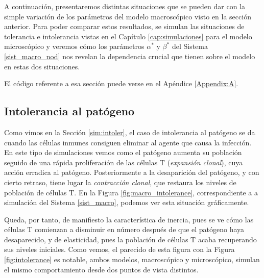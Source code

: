 A continuación, presentaremos distintas situaciones que se pueden dar con la simple variación de los parámetros del modelo macroscópico visto en la sección anterior. Para poder comparar estos resultados, se simulan las situaciones de tolerancia e intolerancia vistas en el Capítulo \ref{cap:simulaciones} para el modelo microscópico y veremos cómo los parámetros $\alpha^{*}$ y $\beta^{*}$ del Sistema \ref{sist_macro_nod} nos revelan la dependencia crucial que tienen sobre el modelo en estas dos situaciones.

El código referente a esa sección puede verse en el Apéndice \ref{Appendix:A}.



\subsection{Intolerancia al patógeno}
\label{sub:simMacroIntoler}

Como vimos en la Sección \ref{sim:intoler}, el caso de intolerancia al patógeno se da cuando las células inmunes consiguen eliminar al agente que causa la infección. 
En este tipo de simulaciones vemos como el patógeno aumenta su población seguido de una rápida proliferación de las células T (\textit{expansión clonal}), cuya acción erradica al patógeno. Posteriormente a la desaparición del patógeno, y con cierto retraso, tiene lugar la \textit{contracción clonal}, que restaura los niveles de población de células T. En la Figura \ref{fig:macro_intolerance}, correspondiente a a simulación del Sistema \ref{sist_macro}, podemos ver esta situación gráficamente. 

Queda, por tanto, de manifiesto la característica de inercia, pues se ve cómo las células T comienzan a disminuir en número después de que el patógeno haya desaparecido, y de elasticidad, pues la población de células T acaba recuperando sus niveles iniciales. Como vemos, el parecido de esta figura con la Figura \ref{fig:intolerance} es notable, ambos modelos, macroscópico y microscópico, simulan el mismo comportamiento desde dos puntos de vista distintos.

